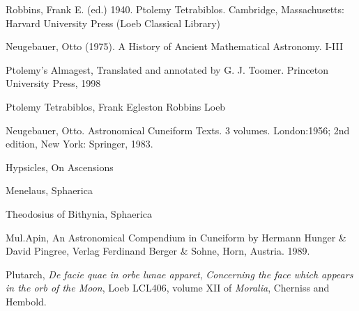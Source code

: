 Robbins, Frank E. (ed.) 1940. Ptolemy Tetrabiblos. Cambridge, Massachusetts: Harvard University Press (Loeb Classical Library)

Neugebauer, Otto (1975). A History of Ancient Mathematical Astronomy. I-III

Ptolemy's Almagest, Translated and annotated by G. J. Toomer. Princeton University Press, 1998

Ptolemy Tetrabiblos, Frank Egleston Robbins Loeb

Neugebauer, Otto. Astronomical Cuneiform Texts. 3 volumes. London:1956; 2nd edition, New York: Springer, 1983.

Hypsicles, On Ascensions

Menelaus, Sphaerica

Theodosius of Bithynia, Sphaerica

Mul.Apin, An Astronomical Compendium in Cuneiform by Hermann Hunger & David Pingree, Verlag Ferdinand Berger \& Sohne, Horn, Austria. 1989.

Plutarch, {\em De facie quae in orbe lunae apparet}, {\em Concerning the face which appears in the orb of the Moon}, Loeb LCL406, volume XII of {\em Moralia}, Cherniss and Hembold.